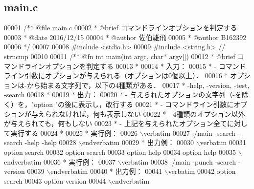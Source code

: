 \subsection{main.\-c}

\begin{DoxyCode}
00001 \textcolor{comment}{/**  @file main.c}
00002 \textcolor{comment}{ *   @brief  コマンドラインオプションを判定する}
00003 \textcolor{comment}{ *   @date   2016/12/15}
00004 \textcolor{comment}{ *   @author 佐伯雄飛}
00005 \textcolor{comment}{ *   @author B162392}
00006 \textcolor{comment}{ */}
00007 
00008 \textcolor{preprocessor}{#include <stdio.h>}
00009 \textcolor{preprocessor}{#include <string.h>}  \textcolor{comment}{// strncmp}
00010 \textcolor{comment}{}
00011 \textcolor{comment}{/** @fn int main(int argc, char* argv[])}
00012 \textcolor{comment}{ *  @brief コマンドラインオプションを判定する}
00013 \textcolor{comment}{ *}
00014 \textcolor{comment}{ *  入力：}
00015 \textcolor{comment}{ *  - コマンドライン引数にオプションが与えられる（オプションは0個以上）．}
00016 \textcolor{comment}{ *    オプションは-から始まる文字列で，以下の4種類がある．}
00017 \textcolor{comment}{ *    -help, -version, -test, -search}
00018 \textcolor{comment}{ *}
00019 \textcolor{comment}{ *  出力：}
00020 \textcolor{comment}{ *  - 与えられたオプションの文字列（-を除く）を，"option "の後に表示し，改行する}
00021 \textcolor{comment}{ *  - コマンドライン引数にオプションが与えられなければ，何も表示しない}
00022 \textcolor{comment}{ *  - 4種類のオプション以外が与えられても，何もしない}
00023 \textcolor{comment}{ *  - 上記を与えられたオプション全てに対して実行する}
00024 \textcolor{comment}{ *}
00025 \textcolor{comment}{ *  実行例：}
00026 \textcolor{comment}{\(\backslash\)verbatim}
00027 \textcolor{comment}{./main -search -search -help -help}
00028 \textcolor{comment}{\(\backslash\)endverbatim}
00029 \textcolor{comment}{  *  出力例：}
00030 \textcolor{comment}{\(\backslash\)verbatim}
00031 \textcolor{comment}{option search}
00032 \textcolor{comment}{option search}
00033 \textcolor{comment}{option help}
00034 \textcolor{comment}{option help}
00035 \textcolor{comment}{\(\backslash\)endverbatim}
00036 \textcolor{comment}{ *  実行例：}
00037 \textcolor{comment}{\(\backslash\)verbatim}
00038 \textcolor{comment}{./main -punch -search -version}
00039 \textcolor{comment}{\(\backslash\)endverbatim}
00040 \textcolor{comment}{  *  出力例：}
00041 \textcolor{comment}{\(\backslash\)verbatim}
00042 \textcolor{comment}{option search}
00043 \textcolor{comment}{option version}
00044 \textcolor{comment}{\(\backslash\)endverbatim}

\end{DoxyCode}
